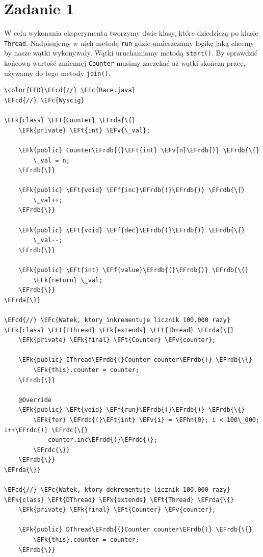 \documentclass[11pt]{article}
\newcommand{\EFc}[1]{\textcolor{EFc}{#1}} %
\newcommand{\EFcd}[1]{\textcolor{EFcd}{#1}} %
\newcommand{\EFk}[1]{\textbf{#1}} %
\newcommand{\EFf}[1]{\textbf{#1}} %
\newcommand{\EFv}[1]{#1} %
\newcommand{\EFt}[1]{\textbf{#1}} %
\newcommand{\EFhn}[1]{\textcolor{EFhn}{\textbf{#1}}} %
\newcommand{\EFrda}[1]{\textcolor{EFrda}{#1}} %
\newcommand{\EFrdb}[1]{\textcolor{EFrdb}{#1}} %
\newcommand{\EFrdc}[1]{\textcolor{EFrdc}{#1}} %
\newcommand{\EFrdd}[1]{\textcolor{EFrdd}{#1}} %
\begin{document}
\section*{Zadanie 1}
\label{sec:orgf387df0}
W celu wykonania eksperymentu tworzymy dwie klasy, które dziedziczą po klasie
\texttt{Thread}. Nadpisujemy w nich metodę \texttt{run} gdzie umieszczamy logikę jaką chcemy by nasze
wątki wykonywały. Wątki uruchamiamy metodą \texttt{start()}. By sprawdzić końcową wartość
zmiennej \texttt{Counter} musimy zaczekać aż wątki skończą pracę, używamy do tego
metody \texttt{join()}.


\begin{Code}
\begin{Verbatim}
\color{EFD}\EFcd{//} \EFc{Race.java}
\EFcd{//} \EFc{Wyscig}

\EFk{class} \EFt{Counter} \EFrda{\{}
    \EFk{private} \EFt{int} \EFv{\_val};

    \EFk{public} Counter\EFrdb{(}\EFt{int} \EFv{n}\EFrdb{)} \EFrdb{\{}
        \_val = n;
    \EFrdb{\}}

    \EFk{public} \EFt{void} \EFf{inc}\EFrdb{(}\EFrdb{)} \EFrdb{\{}
        \_val++;
    \EFrdb{\}}

    \EFk{public} \EFt{void} \EFf{dec}\EFrdb{(}\EFrdb{)} \EFrdb{\{}
        \_val--;
    \EFrdb{\}}

    \EFk{public} \EFt{int} \EFf{value}\EFrdb{(}\EFrdb{)} \EFrdb{\{}
        \EFk{return} \_val;
    \EFrdb{\}}
\EFrda{\}}

\EFcd{//} \EFc{Watek, ktory inkrementuje licznik 100.000 razy}
\EFk{class} \EFt{IThread} \EFk{extends} \EFt{Thread} \EFrda{\{}
    \EFk{private} \EFk{final} \EFt{Counter} \EFv{counter};

    \EFk{public} IThread\EFrdb{(}Counter counter\EFrdb{)} \EFrdb{\{}
        \EFk{this}.counter = counter;
    \EFrdb{\}}

    @Override
    \EFk{public} \EFt{void} \EFf{run}\EFrdb{(}\EFrdb{)} \EFrdb{\{}
        \EFk{for} \EFrdc{(}\EFt{int} \EFv{i} = \EFhn{0}; i < 100\_000; i++\EFrdc{)} \EFrdc{\{}
            counter.inc\EFrdd{(}\EFrdd{)};
        \EFrdc{\}}
    \EFrdb{\}}
\EFrda{\}}

\EFcd{//} \EFc{Watek, ktory dekrementuje licznik 100.000 razy}
\EFk{class} \EFt{DThread} \EFk{extends} \EFt{Thread} \EFrda{\{}
    \EFk{private} \EFk{final} \EFt{Counter} \EFv{counter};

    \EFk{public} DThread\EFrdb{(}Counter counter\EFrdb{)} \EFrdb{\{}
        \EFk{this}.counter = counter;
    \EFrdb{\}}


\end{Verbatim}
\end{Code}
\end{document}
